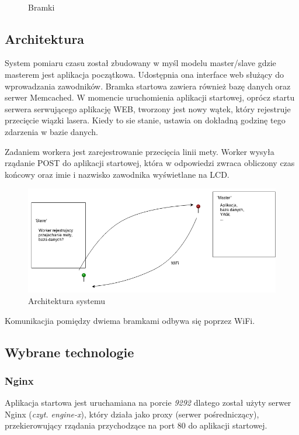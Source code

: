 \documentclass[11pt,a4paper, twoside]{article}
\begin{document}
\begin{figure}[H]
\begin{center}
\caption{Bramki}
$\label{both}$
\end{center}
\end{figure}

\newpage
\subsection{Architektura}
System pomiaru czasu został zbudowany w myśl modelu master/slave gdzie masterem jest aplikacja początkowa. Udostępnia ona interface web służący do wprowadzania zawodników. Bramka startowa zawiera również bazę danych oraz serwer Memcached. W momencie uruchomienia aplikacji startowej, oprócz startu serwera serwującego aplikację WEB, tworzony jest nowy wątek, który rejestruje przecięcie wiązki lasera. Kiedy to sie stanie, ustawia on dokładną godzinę tego zdarzenia w bazie danych.

Zadaniem workera jest zarejestrowanie przecięcia linii mety. Worker wysyła rządanie POST do aplikacji startowej, która w odpowiedzi zwraca obliczony czas końcowy oraz imie i nazwisko zawodnika wyświetlane na LCD.
\newline

\begin{figure}[ht]
\includegraphics[scale=0.5]{./img/asdasd.png}
\caption{Architektura systemu}
\end{figure}
\noindent
Komunikacjia pomiędzy dwiema bramkami odbywa się poprzez WiFi.
\subsection{Wybrane technologie}
\subsubsection{Nginx}
Aplikacja startowa jest uruchamiana na porcie \emph{9292} dlatego został użyty serwer Nginx (\emph{czyt. engine-x}), który działa jako proxy (serwer pośredniczący), przekierowujący rządania przychodzące na port 80 do aplikacji startowej.
\end{document}
